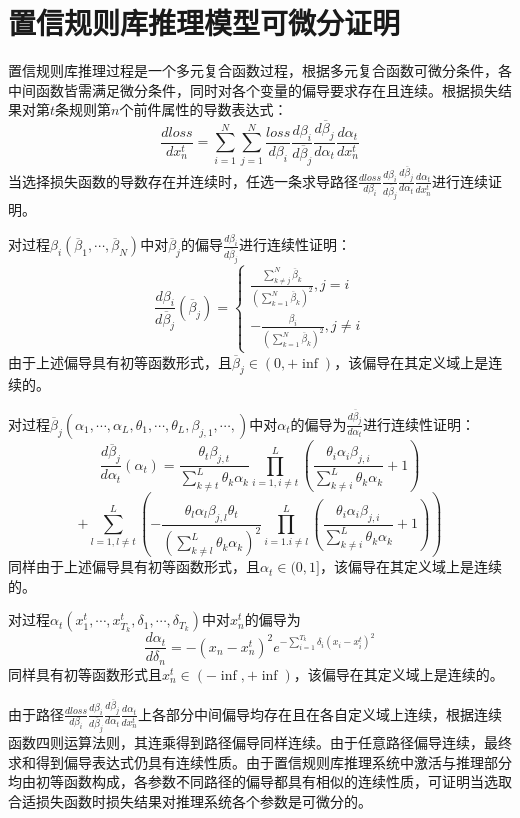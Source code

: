 \documentclass{cjc}
\begin{document}
\section{置信规则库推理模型可微分证明}
\label{Appendix B}
置信规则库推理过程是一个多元复合函数过程，根据多元复合函数可微分条件，各中间函数皆需满足微分条件，同时对各个变量的偏导要求存在且连续。根据损失结果对第$t$条规则第$n$个前件属性的导数表达式：
$$\frac{dloss}{dx_n^t}=\sum_{i=1}^N\sum_{j=1}^N \frac{loss}{d\beta_i}\frac{d\beta_i}{d\overline{\beta}_j}\frac{d\overline{\beta}_j}{d\alpha_t}\frac{d\alpha_t}{dx_n^t}$$
当选择损失函数的导数存在并连续时，任选一条求导路径$\frac{dloss}{d\beta_i}\frac{d\beta_i}{d\overline{\beta}_j}\frac{d\overline{\beta}_j}{d\alpha_t}\frac{d\alpha_t}{dx_n^t}$进行连续证明。


对过程$\beta_i(\overline{\beta}_1,\cdots,\overline{\beta}_N)$中对$\overline{\beta}_j$的偏导$\frac{d\beta_i}{d\overline{\beta}_j}$进行连续性证明：
$$\frac{d\beta_i}{d\overline{\beta}_j}(\overline{\beta}_j)=
\left\{
\begin{aligned}
	\frac{\sum_{k\neq j}^N\overline{\beta}_k}{(\sum_{k=1}^N\overline{\beta}_k)^2},j=i\\
	-\frac{\beta_i}{(\sum_{k=1}^N\overline{\beta}_k)^2},j\neq i
\end{aligned}
\right.$$
由于上述偏导具有初等函数形式，且$\overline{\beta}_j\in(0,+\inf)$，该偏导在其定义域上是连续的。

对过程$\overline{\beta}_j(\alpha_1,\cdots,\alpha_L,\theta_1,\cdots,\theta_L,\beta_{j,1},\cdots,)$中对$\alpha_t$的偏导为$\frac{d\overline{\beta}_j}{d\alpha_t}$进行连续性证明：
$$\frac{d\overline{\beta}_j}{d\alpha_t}(\alpha_t)=\frac{\theta_t\beta_{j,t}}{\sum_{k\neq t}^L\theta_k\alpha_k}\prod_{i=1,i\neq t}^L(\frac{\theta_i\alpha_i\beta_{j,i}}{\sum_{k\neq i}^L{\theta_k\alpha_k}}+1)$$
$$+\sum_{l=1,l\neq t}^L(-\frac{\theta_l\alpha_l\beta_{j,l}\theta_t}{(\sum_{k\neq l}^L\theta_k\alpha_k)^2}\prod_{i=1.i\neq l}^L(\frac{\theta_i\alpha_i\beta_{j,i}}{\sum_{k\neq i}^L{\theta_k\alpha_k}}+1))$$
同样由于上述偏导具有初等函数形式，且$\alpha_t\in(0,1]$，该偏导在其定义域上是连续的。

对过程$\alpha_t(x_1^t,\cdots,x_{T_k}^t,\delta_1,\cdots,\delta_{T_k})$中对$x_n^t$的偏导为$$\frac{d\alpha_t}{d\delta_n}=-(x_n-x_n^t)^{2}e^{-\sum_{i=1}^{T_k}\delta_i(x_i-x_i^t)^2}$$
同样具有初等函数形式且$x_n^t\in(-\inf,+\inf)$，该偏导在其定义域上是连续的。

由于路径$\frac{dloss}{d\beta_i}\frac{d\beta_i}{d\overline{\beta}_j}\frac{d\overline{\beta}_j}{d\alpha_t}\frac{d\alpha_t}{dx_n^t}$上各部分中间偏导均存在且在各自定义域上连续，根据连续函数四则运算法则，其连乘得到路径偏导同样连续。由于任意路径偏导连续，最终求和得到偏导表达式仍具有连续性质。由于置信规则库推理系统中激活与推理部分均由初等函数构成，各参数不同路径的偏导都具有相似的连续性质，可证明当选取合适损失函数时损失结果对推理系统各个参数是可微分的。


\makebiographies
\end{document}

